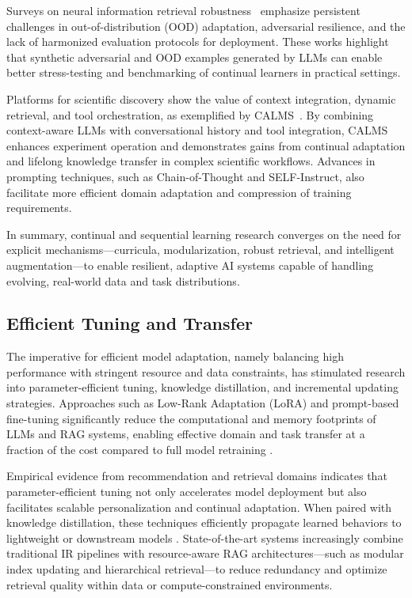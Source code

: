 \documentclass[sigconf]{acmart}
\begin{document}
Surveys on neural information retrieval robustness~\cite{ref26,ref64} emphasize persistent challenges in out-of-distribution (OOD) adaptation, adversarial resilience, and the lack of harmonized evaluation protocols for deployment. These works highlight that synthetic adversarial and OOD examples generated by LLMs can enable better stress-testing and benchmarking of continual learners in practical settings.

Platforms for scientific discovery show the value of context integration, dynamic retrieval, and tool orchestration, as exemplified by CALMS~\cite{ref30}. By combining context-aware LLMs with conversational history and tool integration, CALMS enhances experiment operation and demonstrates gains from continual adaptation and lifelong knowledge transfer in complex scientific workflows. Advances in prompting techniques, such as Chain-of-Thought and SELF-Instruct, also facilitate more efficient domain adaptation and compression of training requirements.

In summary, continual and sequential learning research converges on the need for explicit mechanisms—curricula, modularization, robust retrieval, and intelligent augmentation—to enable resilient, adaptive AI systems capable of handling evolving, real-world data and task distributions.

\subsection{Efficient Tuning and Transfer}

The imperative for efficient model adaptation, namely balancing high performance with stringent resource and data constraints, has stimulated research into parameter-efficient tuning, knowledge distillation, and incremental updating strategies. Approaches such as Low-Rank Adaptation (LoRA) and prompt-based fine-tuning significantly reduce the computational and memory footprints of LLMs and RAG systems, enabling effective domain and task transfer at a fraction of the cost compared to full model retraining \cite{ref32, ref33, ref55, ref61}.

Empirical evidence from recommendation and retrieval domains indicates that parameter-efficient tuning not only accelerates model deployment but also facilitates scalable personalization and continual adaptation. When paired with knowledge distillation, these techniques efficiently propagate learned behaviors to lightweight or downstream models \cite{ref55}. State-of-the-art systems increasingly combine traditional IR pipelines with resource-aware RAG architectures—such as modular index updating and hierarchical retrieval—to reduce redundancy and optimize retrieval quality within data or compute-constrained environments.
\end{document}
